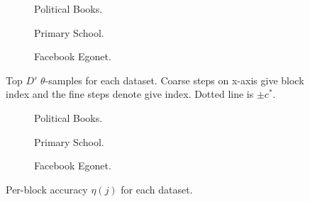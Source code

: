\begin{figure}[!h]
	\centering
	\begin{subfigure}{0.32\linewidth}
		\centering
		\caption{Political Books.}
		\label{fig:polbooks-null}
	\end{subfigure}
	\begin{subfigure}{0.32\linewidth}
		\centering
		\caption{Primary School.}
		\label{fig:school-null}
	\end{subfigure}
	\begin{subfigure}{0.32\linewidth}
		\centering
		\caption{Facebook Egonet.}
		\label{fig:fb-null}
	\end{subfigure}
	\caption{Top $D'$ $\theta$-samples for each dataset. Coarse steps on x-axis give block index and the fine steps denote give index. Dotted line is $\pm c^*$.}
\end{figure}
%
\begin{figure}[!h]
	\centering
	\begin{subfigure}{0.32\linewidth}
		\centering
		\caption{Political Books.}
		\label{fig:polbooks-accuracy}
	\end{subfigure}
	\begin{subfigure}{0.32\linewidth}
		\centering
		\caption{Primary School.}
		\label{fig:school-accuracy}
	\end{subfigure}
	\begin{subfigure}{0.32\linewidth}
		\centering
		\caption{Facebook Egonet.}
		\label{fig:fb-accuracy}
	\end{subfigure}
	\caption{Per-block accuracy $\eta(j)$ for each dataset.}
\end{figure}
\FloatBarrier
